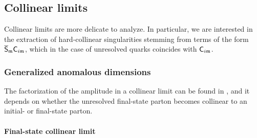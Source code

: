 \subsection{Collinear limits}

Collinear limits are more delicate to analyze. In particular, we are interested in the extraction of hard-collinear singularities stemming from terms of the form $ \overline{\mathsf{S}}_{\mathfrak{m}} \mathsf{C}_{i\mathfrak{m}} $, which in the case of unresolved quarks coincides with $ \mathsf{C}_{i\mathfrak{m}} $.

\subsubsection{Generalized anomalous dimensions}

The factorization of the amplitude in a collinear limit can be found in \cite{Catani-1997}, and it depends on whether the unresolved final-state parton becomes collinear to an initial- or final-state parton.

\paragraph{Final-state collinear limit}

